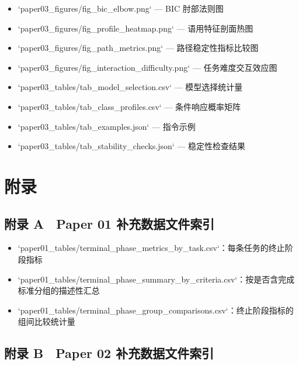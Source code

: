 \documentclass[12pt,a4paper,openany,oneside]{ctexrep}
\begin{document}
\begin{itemize}
\item `paper03\_figures/fig\_bic\_elbow.png` — BIC 肘部法则图

\item `paper03\_figures/fig\_profile\_heatmap.png` — 语用特征剖面热图

\item `paper03\_figures/fig\_path\_metrics.png` — 路径稳定性指标比较图

\item `paper03\_figures/fig\_interaction\_difficulty.png` — 任务难度交互效应图

\item `paper03\_tables/tab\_model\_selection.csv` — 模型选择统计量

\item `paper03\_tables/tab\_class\_profiles.csv` — 条件响应概率矩阵

\item `paper03\_tables/tab\_examples.json` — 指令示例

\item `paper03\_tables/tab\_stability\_checks.json` — 稳定性检查结果
\end{itemize}


\newpage

\appendix
\chapter{附录}


\section{附录 A　Paper 01 补充数据文件索引}


\begin{itemize}
\item `paper01\_tables/terminal\_phase\_metrics\_by\_task.csv`：每条任务的终止阶段指标
\item `paper01\_tables/terminal\_phase\_summary\_by\_criteria.csv`：按是否含完成标准分组的描述性汇总
\item `paper01\_tables/terminal\_phase\_group\_comparisons.csv`：终止阶段指标的组间比较统计量
\end{itemize}


\section{附录 B　Paper 02 补充数据文件索引}
\end{document}
